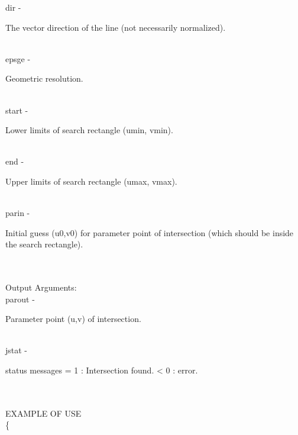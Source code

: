         \>\>    {\fov dir}\> - \>  \begin{minipg2}
                     The vector direction of the line
                        (not necessarily normalized).
                               \end{minipg2}\\
        \>\>    {\fov epsge}\> - \>  \begin{minipg2}
                     Geometric resolution.
                               \end{minipg2}\\
        \>\>    {\fov start}\> - \>  \begin{minipg2}
                     Lower limits of search rectangle (umin, vmin).
                               \end{minipg2}\\
        \>\>    {\fov end}\> - \>  \begin{minipg2}
                     Upper limits of search rectangle (umax, vmax).
                               \end{minipg2}\\
        \>\>    {\fov parin}\> - \>  \begin{minipg2}
                     Initial guess (u0,v0) for parameter point of
                        intersection (which should be inside the
                        search rectangle).
                               \end{minipg2}\\
\\
	\>Output Arguments:\\
        \>\>    {\fov parout}\> - \>  \begin{minipg2}
                     Parameter point (u,v) of intersection.
                               \end{minipg2}\\
        \>\>    {\fov jstat}\> - \>  \begin{minipg2}
                     status messages  
                                = 1   : Intersection found.
                                < 0   : error.
                               \end{minipg2}\\
\\
EXAMPLE OF USE\\
		\>      \{ \\

